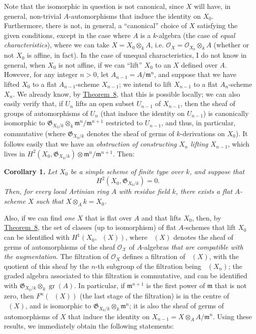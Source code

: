\documentclass{article}
\newenvironment{itenv}[1]
  {\phantomsection\par\medskip\noindent\textbf{#1.}\itshape}
  {\medskip}
\newcommand{\scr}[1]{{\mathscr{#1}}}
\newcommand{\fk}{\mathfrak}
\DeclareMathOperator{\Aut}{Aut}
\DeclareMathOperator{\shAut}{\underline{\Aut}}
\DeclareMathOperator{\gr}{gr}
\newcommand{\oldpage}[1]{\marginpar{\footnotesize$\Big\vert$ \textit{p.~#1}}}
\begin{document}
Note that the isomorphic in question is not canonical, since $X$ will have, in general, non-trivial $A$-automorphisms that induce the identity on $X_0$.
Furthermore, there is not, in general, a ``canonical'' choice of $X$ satisfying the given conditions, except in the case where $A$ is a $k$-algebra (the case of \emph{equal characteristics}), where we can take $X=X_0\otimes_k A$, i.e. $\scr{O}_X=\scr{O}_{X_0}\otimes_k A$ (whether or not $X_0$ is affine, in fact).
In the case of unequal characteristics, I do not know in general, when $X_0$ is not affine, if we can ``lift'' $X_0$ to an $X$ defined over $A$.
However, for any integer $n>0$, let $A_{n-1}=A/\fk{m}^n$, and suppose that we have lifted $X_0$ to a flat $A_{n-1}$-scheme $X_{n-1}$;
we intend to lift $X_{n-1}$ to a flat $A_n$-scheme $X_n$.
We already know, by \hyperref[theorem8]{Theorem~8}, that this is possible locally;
we can also easily verify that, if $U_n$ lifts an open subset $U_{n-1}$ of $X_{n-1}$, then the sheaf of groups of automorphisms of $U_n$ (that induce the identity on $U_{n-1}$) is canonically isomorphic to $\fk{G}_{X_0/k}\otimes_k\fk{m}^n/\fk{m}^{n+1}$ restricted to $U_{n-1}$, and thus, in particular, commutative (where $\fk{G}_{X_0/k}$ denotes the sheaf of germs of $k$-derivations on $X_0$).
It follows easily that we have an \emph{obstruction of constructing $X_n$ lifting $X_{n-1}$}, which lives in $H^2(X_0,\fk{G}_{X_0/k})\otimes\fk{m}^n/\fk{m}^{n+1}$.
Then:

\begin{itenv}{Corollary 1}
\label{theorem8corollary1}
  Let $X_0$ be a simple scheme of finite type over $k$, and suppose that
\oldpage{182-13}
  \[H^2(X_0,\fk{G}_{X_0/k})=0.\]
  Then, for every local Artinian ring $A$ with residue field $k$, there exists a flat $A$-scheme $X$ such that $X\otimes_A k=X_0$.
\end{itenv}

Also, if we can find \emph{one} $X$ that is flat over $A$ and that lifts $X_0$, then, by \hyperref[theorem8]{Theorem~8}, the set of classes (up to isomorphism) of flat $A$-schemes that lift $X_0$ can be identified with $H^1(X_0,\shAut(X))$, where $\shAut(X)$ denotes the sheaf of germs of automorphisms of the sheaf $\scr{O_X}$ of $A$-algebras \emph{that are compatible with the augmentation}.
The filtration of $\scr{O}_X$ defines a filtration of $\shAut(X)$, with the quotient of this sheaf by the $n$-th subgroup of the filtration being $\shAut(X_n)$;
the graded algebra associated to this filtration is commutative, and can be identified with $\fk{G}_{X_0/k}\otimes_k\gr(A)$.
In particular, if $\fk{m}^{n+1}$ is the first power of $\fk{m}$ that is not zero, then $F^n(\shAut(X))$ (the last stage of the filtration) is in the centre of $\shAut(X)$, and is isomorphic to $\fk{G}_{X_0/k}\otimes_k\fk{m}^n$;
it is also the sheaf of germs of automorphisms of $X$ that induce the identity on $X_{n-1}=X\otimes_A A/\fk{m}^n$.
Using these results, we immediately obtain the following statements:
\end{document}
